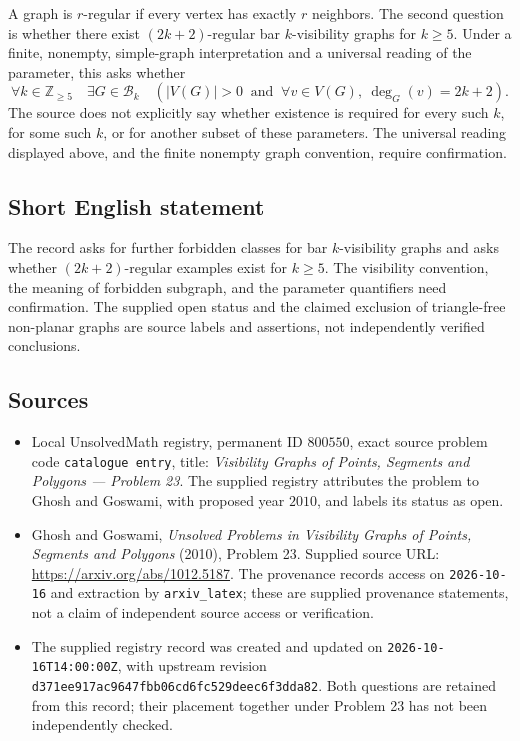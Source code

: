 \documentclass[11pt]{article}
\newcommand{\Z}{\mathbb{Z}}
\begin{document}
A graph is \(r\)-regular if every vertex has exactly \(r\) neighbors. The second question is whether there exist \((2k+2)\)-regular bar \(k\)-visibility graphs for \(k\geq 5\). Under a finite, nonempty, simple-graph interpretation and a universal reading of the parameter, this asks whether
\[
\forall k\in\Z_{\geq 5}\quad
\exists G\in\mathcal B_k\quad
\left(|V(G)|>0\ \text{ and }\ \forall v\in V(G),\ \deg_G(v)=2k+2\right).
\]
The source does not explicitly say whether existence is required for every such \(k\), for some such \(k\), or for another subset of these parameters. The universal reading displayed above, and the finite nonempty graph convention, require confirmation.
\subsection{Short English statement}
The record asks for further forbidden classes for bar \(k\)-visibility graphs and asks whether \((2k+2)\)-regular examples exist for \(k\geq 5\). The visibility convention, the meaning of forbidden subgraph, and the parameter quantifiers need confirmation. The supplied open status and the claimed exclusion of triangle-free non-planar graphs are source labels and assertions, not independently verified conclusions.
\subsection{Sources}
\begin{itemize}
\item Local UnsolvedMath registry, permanent ID \(800550\), exact source problem code \texttt{catalogue entry}, title: \emph{Visibility Graphs of Points, Segments and Polygons --- Problem 23}. The supplied registry attributes the problem to Ghosh and Goswami, with proposed year \(2010\), and labels its status as open.
\item Ghosh and Goswami, \emph{Unsolved Problems in Visibility Graphs of Points, Segments and Polygons} (2010), Problem 23. Supplied source URL: \url{https://arxiv.org/abs/1012.5187}. The provenance records access on \texttt{2026-10-16} and extraction by \texttt{arxiv\_latex}; these are supplied provenance statements, not a claim of independent source access or verification.
\item The supplied registry record was created and updated on \texttt{2026-10-16T14:00:00Z}, with upstream revision \texttt{d371ee917ac9647fbb06cd6fc529deec6f3dda82}. Both questions are retained from this record; their placement together under Problem 23 has not been independently checked.
\end{itemize}
\end{document}
